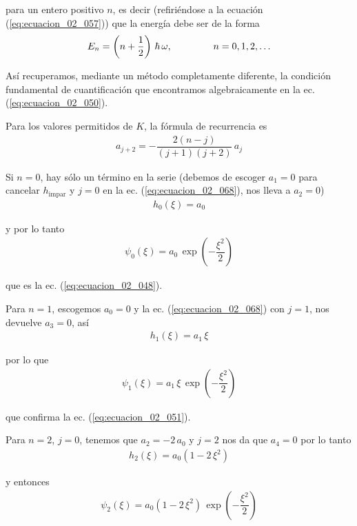 para un entero positivo $n$, es decir (refiriéndose a la ecuación (\ref{eq:ecuacion_02_057})) que la energía debe ser de la forma
\begin{align}
E_{n} = \left( n + \dfrac{1}{2} \right) \, \hbar \, \omega , \hspace{1.5cm} n = 0, 1, 2, \ldots
\label{eq:ecuacion_02_067}
\end{align}

Así recuperamos, mediante un método completamente diferente, la condición fundamental de cuantificación que encontramos algebraicamente en la ec. (\ref{eq:ecuacion_02_050}).
\par
Para los valores permitidos de $K$, la fórmula de recurrencia es
\begin{align}
a_{j+2} = - \dfrac{2 (n - j)}{(j + 1)(j + 2)} \, a_{j}
\label{eq:ecuacion_02_068}
\end{align}

Si $n = 0$, hay sólo un término en la serie (debemos de escoger $a_{1} = 0$ para cancelar $h_{\text{impar}}$ y $j=0$ en la ec. (\ref{eq:ecuacion_02_068}), nos lleva a $a_{2}=0$)
\begin{align*}
h_{0} (\xi) = a_{0}
\end{align*}

y por lo tanto
\begin{align*}
\psi_{0} (\xi) = a_{0} \, \exp \left( - \dfrac{\xi^{2}}{2} \right)
\end{align*}

que es la ec. (\ref{eq:ecuacion_02_048}).
\par
Para $n=1$, escogemos $a_{0} = 0$ y la ec. (\ref{eq:ecuacion_02_068}) con $j = 1$, nos devuelve $a_{3} = 0$, así
\begin{align*}
h_{1} (\xi) = a_{1} \, \xi
\end{align*}

por lo que
\begin{align*}
\psi_{1} (\xi) = a_{1} \, \xi \, \exp \left( - \dfrac{\xi^{2}}{2} \right)
\end{align*}

que confirma la ec. (\ref{eq:ecuacion_02_051}).
\par
Para $n = 2$, $j = 0$, tenemos que $a_{2} = - 2 \, a_{0}$ y $j = 2$ nos da que $a_{4} = 0$ por lo tanto
\begin{align*}
h_{2} (\xi) = a_{0} (1 - 2 \, \xi^{2})
\end{align*}

y entonces
\begin{align*}
\psi_{2} (\xi) = a_{0} (1 - 2 \, \xi^{2}) \, \exp \left( - \dfrac{\xi^{2}}{2} \right)
\end{align*}

